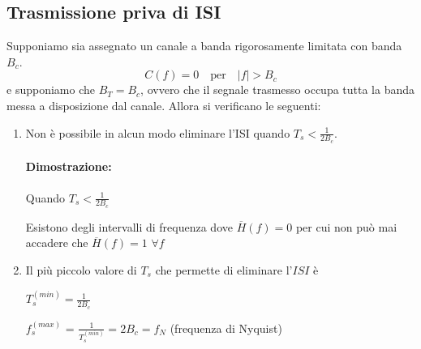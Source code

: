 \subsection*{Trasmissione priva di ISI}
Supponiamo sia assegnato un canale a banda rigorosamente limitata con banda \( B_c \).
\[ C(f) = 0 \quad \text{per} \quad |f| > B_c \]
e supponiamo che \( B_T = B_c \), ovvero che il segnale trasmesso occupa tutta la banda messa a disposizione dal canale.
Allora si verificano le seguenti:
\begin{enumerate}
    \item Non è possibile in alcun modo eliminare l'ISI quando \( T_s < \frac{1}{2B_c} \).


\paragraph*{Dimostrazione:}

Quando \( T_s < \frac{1}{2B_c} \)


Esistono degli intervalli di frequenza dove \( \overline{H}(f) = 0 \) per cui non può mai accadere che \( \overline{H}(f) = 1 \) \( \forall f \)

\bigskip

\item Il più piccolo valore di \( T_s \) che permette di eliminare l'\( ISI \) è

\( T_s^{(min)} = \frac{1}{2B_c} \)

\bigskip

\( f_s^{(max)}\) = \( \frac{1}{T_s^{(min)}} = 2B_c = f_N \) \quad (frequenza di Nyquist)

\bigskip

\end{enumerate}
